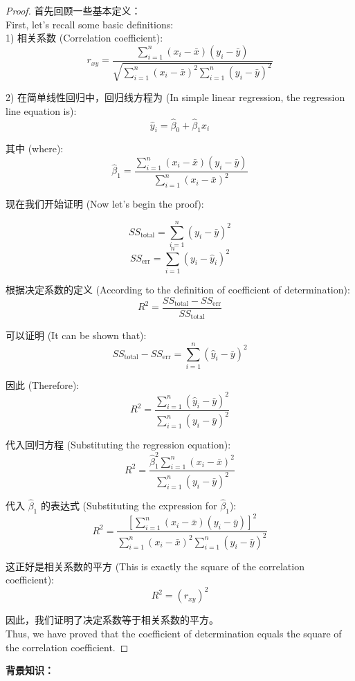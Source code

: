 \documentclass[UTF8]{report}
\theoremstyle{MyLineTheoremStyle} %
\theoremstyle{MyBlockTheoremStyle} %
\theoremstyle{MySubsubsectionStyle} %
\begin{document}
\begin{proof}
    首先回顾一些基本定义：\\
    First, let's recall some basic definitions:\\
    
    1) 相关系数 (Correlation coefficient):
    $$r_{xy} = \frac{\sum_{i=1}^n (x_i - \bar{x})(y_i - \bar{y})}{\sqrt{\sum_{i=1}^n (x_i - \bar{x})^2 \sum_{i=1}^n (y_i - \bar{y})^2}}$$
    
    2) 在简单线性回归中，回归线方程为 (In simple linear regression, the regression line equation is):
    $$\hat{y}_i = \hat{\beta}_0 + \hat{\beta}_1x_i$$
    
    其中 (where):
    $$\hat{\beta}_1 = \frac{\sum_{i=1}^n (x_i - \bar{x})(y_i - \bar{y})}{\sum_{i=1}^n (x_i - \bar{x})^2}$$
    
    现在我们开始证明 (Now let's begin the proof):
    
    $$SS_{\text{total}} = \sum_{i=1}^n (y_i - \bar{y})^2$$
    $$SS_{\text{err}} = \sum_{i=1}^n (y_i - \hat{y}_i)^2$$
    
    根据决定系数的定义 (According to the definition of coefficient of determination):
    $$R^2 = \frac{SS_{\text{total}} - SS_{\text{err}}}{SS_{\text{total}}}$$
    
    可以证明 (It can be shown that):
    $$SS_{\text{total}} - SS_{\text{err}} = \sum_{i=1}^n (\hat{y}_i - \bar{y})^2$$
    
    因此 (Therefore):
    $$R^2 = \frac{\sum_{i=1}^n (\hat{y}_i - \bar{y})^2}{\sum_{i=1}^n (y_i - \bar{y})^2}$$
    
    代入回归方程 (Substituting the regression equation):
    $$R^2 = \frac{\hat{\beta}_1^2 \sum_{i=1}^n (x_i - \bar{x})^2}{\sum_{i=1}^n (y_i - \bar{y})^2}$$
    
    代入 $\hat{\beta}_1$ 的表达式 (Substituting the expression for $\hat{\beta}_1$):
    $$R^2 = \frac{[\sum_{i=1}^n (x_i - \bar{x})(y_i - \bar{y})]^2}{\sum_{i=1}^n (x_i - \bar{x})^2 \sum_{i=1}^n (y_i - \bar{y})^2}$$
    
    这正好是相关系数的平方 (This is exactly the square of the correlation coefficient):
    $$R^2 = (r_{xy})^2$$
    
    因此，我们证明了决定系数等于相关系数的平方。\\
    Thus, we have proved that the coefficient of determination equals the square of the correlation coefficient.
    \end{proof}

\textbf{背景知识：}\\
\end{document}
